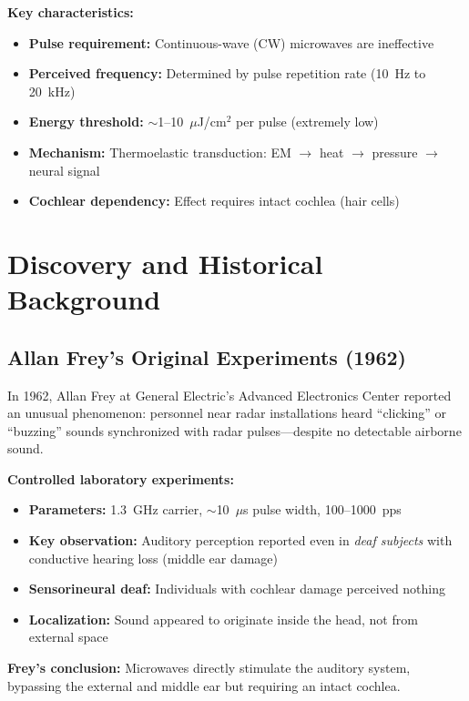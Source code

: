 \textbf{Key characteristics:}
\begin{itemize}
\item \textbf{Pulse requirement:} Continuous-wave (CW) microwaves are ineffective
\item \textbf{Perceived frequency:} Determined by pulse repetition rate (10~Hz to 20~kHz)
\item \textbf{Energy threshold:} $\sim$1--10~$\mu$J/cm$^2$ per pulse (extremely low)
\item \textbf{Mechanism:} Thermoelastic transduction: EM $\rightarrow$ heat $\rightarrow$ pressure $\rightarrow$ neural signal
\item \textbf{Cochlear dependency:} Effect requires intact cochlea (hair cells)
\end{itemize}



\section{Discovery and Historical Background}

\subsection{Allan Frey's Original Experiments (1962)}

In 1962, Allan Frey at General Electric's Advanced Electronics Center reported an unusual phenomenon: personnel near radar installations heard ``clicking'' or ``buzzing'' sounds synchronized with radar pulses---despite no detectable airborne sound.

\textbf{Controlled laboratory experiments:}
\begin{itemize}
\item \textbf{Parameters:} 1.3~GHz carrier, $\sim$10~$\mu$s pulse width, 100--1000~pps
\item \textbf{Key observation:} Auditory perception reported even in \emph{deaf subjects} with conductive hearing loss (middle ear damage)
\item \textbf{Sensorineural deaf:} Individuals with cochlear damage perceived nothing
\item \textbf{Localization:} Sound appeared to originate inside the head, not from external space
\end{itemize}

\textbf{Frey's conclusion:} Microwaves directly stimulate the auditory system, bypassing the external and middle ear but requiring an intact cochlea.

